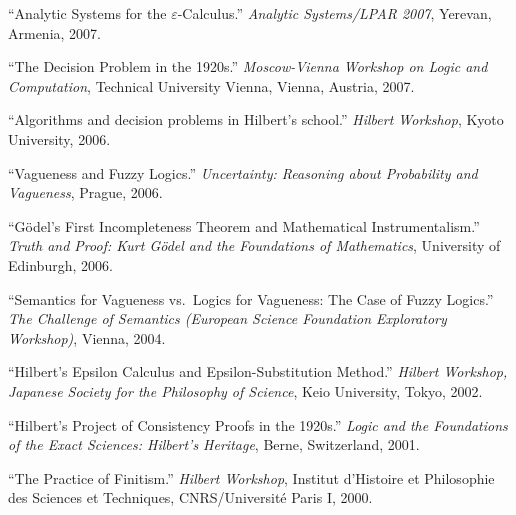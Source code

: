 \documentclass[11pt]{article}
\def\printdate#1{\xprintdate#1-}
\def\xprintdate#1-#2-#3-{#1}
\begin{document}
\ind ``Analytic Systems for the \(\varepsilon\)-Calculus.'' \emph{Analytic Systems/LPAR 2007}, Yerevan, Armenia, \printdate{2007-10-15}.


\ind ``The Decision Problem in the 1920s.'' \emph{Moscow-Vienna Workshop on Logic and Computation}, Technical University Vienna, Vienna, Austria, \printdate{2007-07-02}.



\ind ``Algorithms and decision problems in Hilbert's school.'' \emph{Hilbert Workshop}, Kyoto University, \printdate{2006-11-12}.


\ind ``Vagueness and Fuzzy Logics.'' \emph{Uncertainty: Reasoning about Probability and Vagueness}, Prague, \printdate{2006-12-06}.










\ind ``Gödel's First Incompleteness Theorem and Mathematical Instrumentalism.'' \emph{Truth and Proof: Kurt Gödel and the Foundations of Mathematics}, University of Edinburgh, \printdate{2006-03-25}.









\ind ``Semantics for Vagueness vs.~Logics for Vagueness: The Case of Fuzzy
Logics.'' \emph{The Challenge of Semantics (European Science Foundation Exploratory
Workshop)}, Vienna, \printdate{2004-07-12}.











\ind ``Hilbert's Epsilon Calculus and Epsilon-Substitution Method.'' \emph{Hilbert Workshop, Japanese Society for the Philosophy of Science}, Keio University, Tokyo, \printdate{2002-01-13}.



\ind ``Hilbert's Project of Consistency Proofs in the 1920s.'' \emph{Logic and the Foundations of the Exact Sciences: Hilbert's Heritage}, Berne, Switzerland, \printdate{2001-06-30}.









\ind ``The Practice of Finitism.'' \emph{Hilbert Workshop}, Institut d'Histoire et Philosophie des Sciences et Techniques,
CNRS/Université Paris I, \printdate{2000-05-24}.
\end{document}
